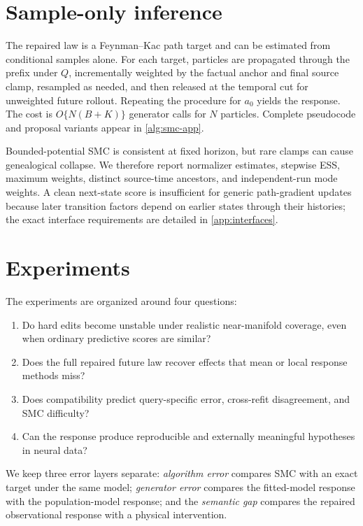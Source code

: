 \documentclass{article}
\theoremstyle{remark}
\begin{document}
\section{Sample-only inference}
\label{sec:algorithm}

The repaired law is a Feynman--Kac path target and can be estimated from
conditional samples alone. For each target, particles are propagated through
the prefix under \(Q\), incrementally weighted by the factual anchor and final
source clamp, resampled as needed, and then released at the temporal cut for
unweighted future rollout. Repeating the procedure for \(a_0\) yields the
response. The cost is \(O\{N(B+K)\}\) generator calls for \(N\) particles.
Complete pseudocode and proposal variants appear in \cref{alg:smc-app}.

Bounded-potential SMC is consistent at fixed horizon, but rare clamps can cause
genealogical collapse. We therefore report normalizer estimates, stepwise ESS,
maximum weights, distinct source-time ancestors, and independent-run mode
weights. A clean next-state score is insufficient for generic path-gradient
updates because later transition factors depend on earlier states through
their histories; the exact interface requirements are detailed in
\cref{app:interfaces}.

\section{Experiments}
\label{sec:experiments}

The experiments are organized around four questions:
\begin{enumerate}[leftmargin=1.5em]
  \item Do hard edits become unstable under realistic near-manifold coverage,
  even when ordinary predictive scores are similar?
  \item Does the full repaired future law recover effects that mean or local
  response methods miss?
  \item Does compatibility predict query-specific error, cross-refit
  disagreement, and SMC difficulty?
  \item Can the response produce reproducible and externally meaningful
  hypotheses in neural data?
\end{enumerate}
We keep three error layers separate:
\emph{algorithm error} compares SMC with an exact target under the same model;
\emph{generator error} compares the fitted-model response with the
population-model response; and the \emph{semantic gap} compares the repaired
observational response with a physical intervention.
\end{document}
